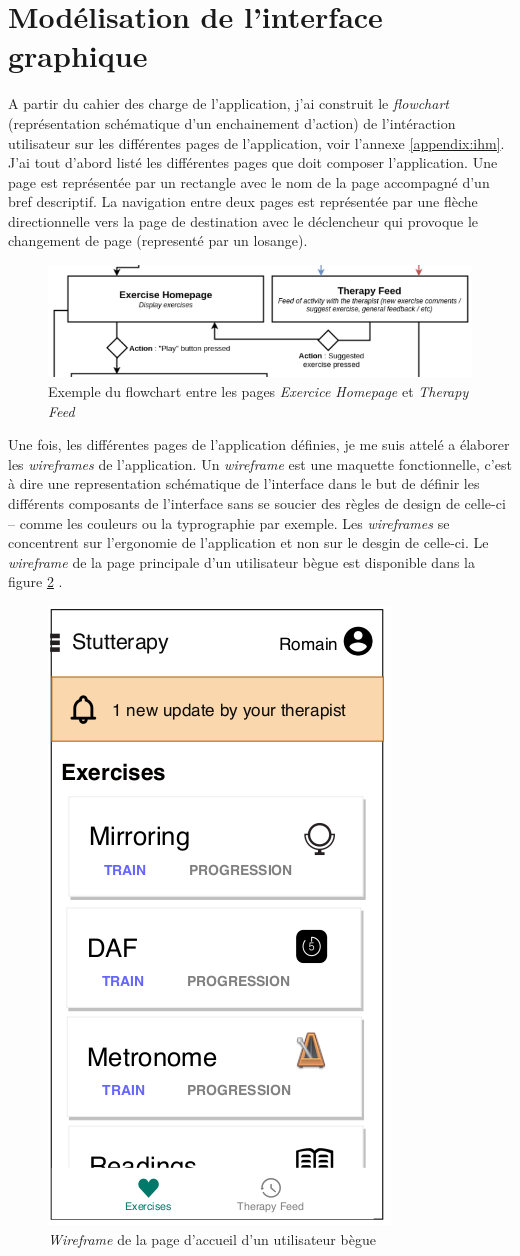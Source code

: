 \section{Modélisation de l'interface graphique}

A partir du cahier des charge de l'application, j'ai construit le \textit{flowchart} (représentation schématique d'un enchainement d'action) de l'intéraction utilisateur sur les différentes pages de l'application, voir l'annexe \ref{appendix:ihm}. J'ai tout d'abord listé les différentes pages que doit composer l'application. Une page est représentée par un rectangle avec le nom de la page accompagné d'un bref descriptif. La navigation entre deux pages est représentée par une flèche directionnelle vers la page de destination avec le déclencheur qui provoque le changement de page (representé par un losange).

\begin{figure}[H]
  \includegraphics[width=.8\linewidth]{content/imgs/ihm_ex.png}
  \caption{Exemple du flowchart entre les pages \textit{Exercice Homepage} et \textit{Therapy Feed}}
  \label{fig:flowchart}
\end{figure}

Une fois, les différentes pages de l'application définies, je me suis attelé a élaborer les \textit{wireframes} de l'application. Un \textit{wireframe} est une maquette fonctionnelle, c'est à dire une representation schématique de l'interface dans le but de définir les différents composants de l'interface sans se soucier des règles de design de celle-ci -- comme les couleurs ou la typrographie par exemple. Les \textit{wireframes} se concentrent sur l'ergonomie de l'application et non sur le desgin de celle-ci. Le \textit{wireframe} de la page principale d'un utilisateur bègue est disponible dans la figure \ref{fig:wireframe} .


\begin{figure}[H]
  \includegraphics[width=.3\linewidth]{content/imgs/wireframe_ex.png}
  \caption{\textit{Wireframe} de la page d'accueil d'un utilisateur bègue}
  \label{fig:wireframe}
\end{figure}

